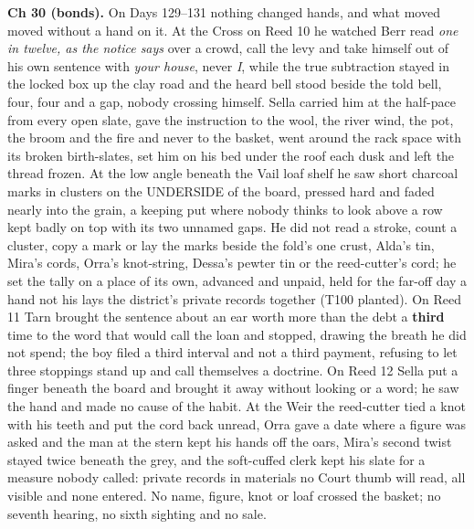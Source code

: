\documentclass{design/chronicle}
\begin{document}
{\textbf{Ch 30 (bonds).} On Days 129–131 nothing changed hands, and what moved moved without a hand on it. At the Cross on Reed 10 he watched Berr read \emph{one in twelve, as the notice says} over a crowd, call the levy and take himself out of his own sentence with \emph{your house}, never \emph{I}, while the true subtraction stayed in the locked box up the clay road and the heard bell stood beside the told bell, four, four and a gap, nobody crossing himself. Sella carried him at the half-pace from every open slate, gave the instruction to the wool, the river wind, the pot, the broom and the fire and never to the basket, went around the rack space with its broken birth-slates, set him on his bed under the roof each dusk and left the thread frozen. At the low angle beneath the Vail loaf shelf he saw short charcoal marks in clusters on the UNDERSIDE of the board, pressed hard and faded nearly into the grain, a keeping put where nobody thinks to look above a row kept badly on top with its two unnamed gaps. He did not read a stroke, count a cluster, copy a mark or lay the marks beside the fold’s one crust, Alda’s tin, Mira’s cords, Orra’s knot-string, Dessa’s pewter tin or the reed-cutter’s cord; he set the tally on a place of its own, advanced and unpaid, held for the far-off day a hand not his lays the district’s private records together (T100 planted). On Reed 11 Tarn brought the sentence about an ear worth more than the debt a \textbf{third} time to the word that would call the loan and stopped, drawing the breath he did not spend; the boy filed a third interval and not a third payment, refusing to let three stoppings stand up and call themselves a doctrine. On Reed 12 Sella put a finger beneath the board and brought it away without looking or a word; he saw the hand and made no cause of the habit. At the Weir the reed-cutter tied a knot with his teeth and put the cord back unread, Orra gave a date where a figure was asked and the man at the stern kept his hands off the oars, Mira’s second twist stayed twice beneath the grey, and the soft-cuffed clerk kept his slate for a measure nobody called: private records in materials no Court thumb will read, all visible and none entered. No name, figure, knot or loaf crossed the basket; no seventh hearing, no sixth sighting and no sale.

}
\end{document}
